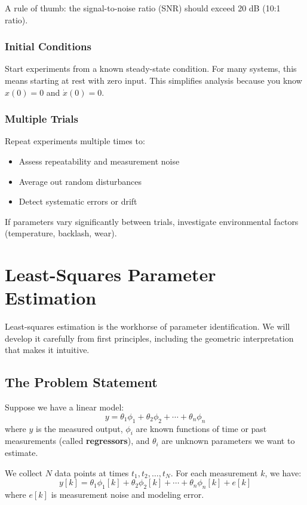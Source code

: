 A rule of thumb: the signal-to-noise ratio (SNR) should exceed 20 dB (10:1 ratio).

\subsubsection{Initial Conditions}

Start experiments from a known steady-state condition. For many systems, this means starting at rest with zero input. This simplifies analysis because you know $x(0) = 0$ and $\dot{x}(0) = 0$.

\subsubsection{Multiple Trials}

Repeat experiments multiple times to:
\begin{itemize}
    \item Assess repeatability and measurement noise
    \item Average out random disturbances
    \item Detect systematic errors or drift
\end{itemize}

If parameters vary significantly between trials, investigate environmental factors (temperature, backlash, wear).

\section{Least-Squares Parameter Estimation}

Least-squares estimation is the workhorse of parameter identification. We will develop it carefully from first principles, including the geometric interpretation that makes it intuitive.

\subsection{The Problem Statement}

Suppose we have a linear model:
\begin{equation}
y = \theta_1 \phi_1 + \theta_2 \phi_2 + \cdots + \theta_n \phi_n
\end{equation}
where $y$ is the measured output, $\phi_i$ are known functions of time or past measurements (called \textbf{regressors}), and $\theta_i$ are unknown parameters we want to estimate.

We collect $N$ data points at times $t_1, t_2, \ldots, t_N$. For each measurement $k$, we have:
\begin{equation}
y[k] = \theta_1 \phi_1[k] + \theta_2 \phi_2[k] + \cdots + \theta_n \phi_n[k] + e[k]
\end{equation}
where $e[k]$ is measurement noise and modeling error.

